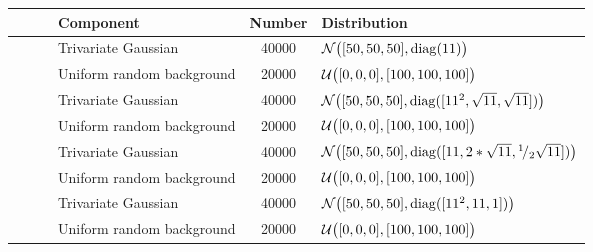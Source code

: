 \small
{}
\begin{tabular}{@{}cclSl@{}}
\toprule
				&~						& Component					& {Number} 	& Distribution\\
\midrule
\ferdosiOne 	&\legendComponentOne	& Trivariate Gaussian 		& 40000		& $\mathcal{N}\big([50, 50, 50], \operatorname{diag}(11)\big)$\\
~ 				&\legendComponentNoise	& Uniform random background	& 20000		& $\mathcal{U}\big([0, 0, 0], [100, 100, 100]\big)$\\
\hline
\baakmanOne		&\legendComponentOne	& Trivariate Gaussian 		& 40000		& $\mathcal{N}\big([50, 50, 50], \operatorname{diag}([11^2, \sqrt{11}, \sqrt{11}])\big)$\\
~ 				&\legendComponentNoise	& Uniform random background	& 20000		& $\mathcal{U}\big([0, 0, 0], [100, 100, 100]\big)$\\
\hline
\baakmanFour	&\legendComponentOne	& Trivariate Gaussian 		& 40000		& $\mathcal{N}\big([50, 50, 50], \operatorname{diag}([11, 2 * \sqrt{11}, {}^{1}\!/_{2} \sqrt{11}])\big)$\\
~ 				&\legendComponentNoise	& Uniform random background	& 20000		& $\mathcal{U}\big([0, 0, 0], [100, 100, 100]\big)$\\
\hline
\baakmanFive	&\legendComponentOne	& Trivariate Gaussian 		& 40000		& $\mathcal{N}\big([50, 50, 50], \operatorname{diag}([11^2, 11, 1])\big)$\\
~ 				&\legendComponentNoise	& Uniform random background	& 20000		& $\mathcal{U}\big([0, 0, 0], [100, 100, 100]\big)$\\
\bottomrule
\end{tabular}